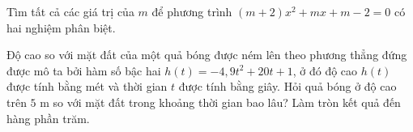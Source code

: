\begin{bt}%
	Tìm tất cả các giá trị của $m$ để phương trình $(m+2)x^2+mx+m-2=0$ có hai nghiệm phân biệt.
\end{bt}
\begin{bt}%
	Độ cao so với mặt đất của một quả bóng được ném lên theo phương thẳng đứng được mô ta bởi hàm số bậc hai $h(t)=-4{,}9t^2+20t+1$, ở đó độ cao $h(t)$ được tính bằng mét và thời gian $t$ được tính bằng giây. Hỏi quả bóng ở độ cao trên $5$ m so với mặt đất trong khoảng thời gian bao lâu? Làm tròn kết quả đến hàng phần trăm.
\end{bt}

